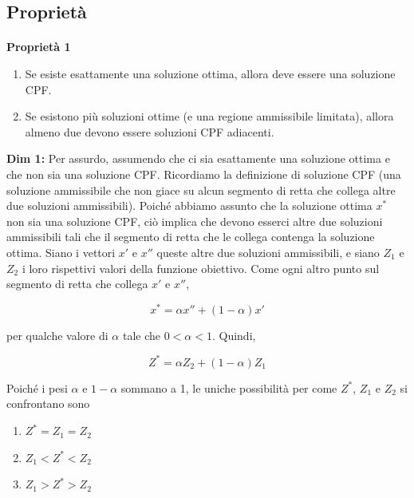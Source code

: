 \documentclass[a4paper, 11pt]{article}
\begin{document}
        \subsection{Proprietà}

        \paragraph{}
        \textbf{Proprietà 1}

        \begin{enumerate}
            \item Se esiste esattamente una soluzione ottima, allora deve essere una soluzione CPF.
            \item Se esistono più soluzioni ottime (e una regione ammissibile limitata), allora almeno due devono essere soluzioni CPF adiacenti.
        \end{enumerate}

        \textbf{Dim 1:} Per assurdo, assumendo che ci sia esattamente una soluzione ottima e che non sia una soluzione CPF. Ricordiamo la definizione di soluzione CPF (una soluzione ammissibile che non giace su alcun segmento di retta che collega altre due soluzioni ammissibili). Poiché abbiamo assunto che la soluzione ottima $x^*$ non sia una soluzione CPF, ciò implica che devono esserci altre due soluzioni ammissibili tali che il segmento di retta che le collega contenga la soluzione ottima. Siano i vettori $x'$ e $x''$ queste altre due soluzioni ammissibili, e siano $Z_1$ e $Z_2$ i loro rispettivi valori della funzione obiettivo. Come ogni altro punto sul segmento di retta che collega $x'$ e $x''$,

        $$
            x^* = \alpha x'' + (1 - \alpha) x'
        $$

        per qualche valore di $\alpha$ tale che $0 < \alpha < 1$. Quindi,

        $$
            Z^* = \alpha Z_2 + (1 - \alpha) Z_1
        $$

        Poiché i pesi $\alpha$ e $1 - \alpha$ sommano a 1, le uniche possibilità per come $Z^*$, $Z_1$ e $Z_2$ si confrontano sono

        \begin{enumerate}
            \item $Z^* = Z_1 = Z_2$
            \item $Z_1 < Z^* < Z_2$
            \item $Z_1 > Z^* > Z_2$
        \end{enumerate}
\end{document}
